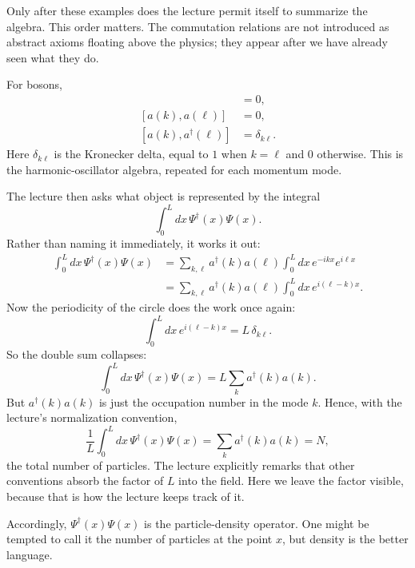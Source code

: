 Only after these examples does the lecture permit itself to summarize the algebra. This order matters. The commutation relations are not introduced as abstract axioms floating above the physics; they appear after we have already seen what they do.

For bosons,
\begin{align}
[a^\dagger(k),a^\dagger(\ell)] &= 0,
\\
[a(k),a(\ell)] &= 0,
\\
[a(k),a^\dagger(\ell)] &= \delta_{k\ell}.
\end{align}
Here \(\delta_{k\ell}\) is the Kronecker delta, equal to \(1\) when \(k=\ell\) and \(0\) otherwise. This is the harmonic-oscillator algebra, repeated for each momentum mode.

The lecture then asks what object is represented by the integral
\begin{equation}
\int_0^L dx\,\Psi^\dagger(x)\Psi(x).
\end{equation}
Rather than naming it immediately, it works it out:
\begin{align}
\int_0^L dx\,\Psi^\dagger(x)\Psi(x)
&=
\sum_{k,\ell}
a^\dagger(k)a(\ell)
\int_0^L dx\,e^{-ikx}e^{i\ell x}
\\
&=
\sum_{k,\ell}
a^\dagger(k)a(\ell)
\int_0^L dx\,e^{i(\ell-k)x}.
\end{align}
Now the periodicity of the circle does the work once again:
\begin{equation}
\int_0^L dx\,e^{i(\ell-k)x}=L\,\delta_{k\ell}.
\end{equation}
So the double sum collapses:
\begin{equation}
\int_0^L dx\,\Psi^\dagger(x)\Psi(x)
=
L\sum_k a^\dagger(k)a(k).
\end{equation}
But \(a^\dagger(k)a(k)\) is just the occupation number in the mode \(k\). Hence, with the lecture's normalization convention,
\begin{equation}
\frac{1}{L}\int_0^L dx\,\Psi^\dagger(x)\Psi(x)
=
\sum_k a^\dagger(k)a(k)
=
N,
\end{equation}
the total number of particles. The lecture explicitly remarks that other conventions absorb the factor of \(L\) into the field. Here we leave the factor visible, because that is how the lecture keeps track of it.

Accordingly, \(\Psi^\dagger(x)\Psi(x)\) is the particle-density operator. One might be tempted to call it the number of particles at the point \(x\), but density is the better language.

